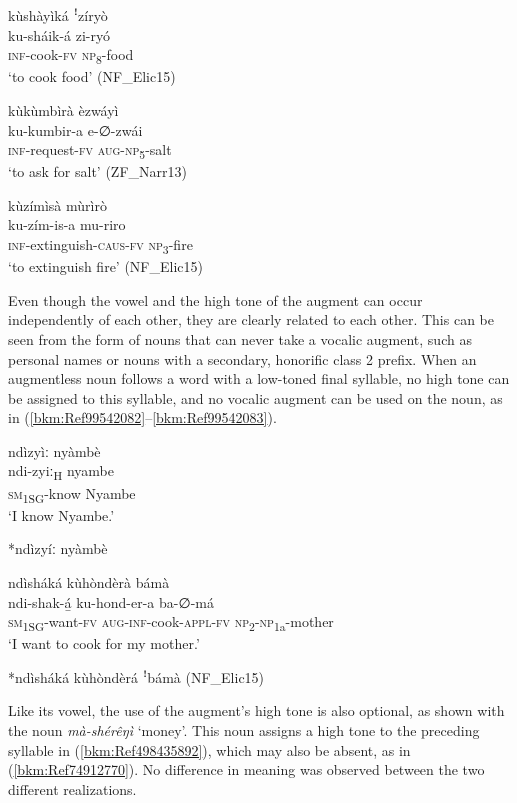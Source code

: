 \ea
\label{bkm:Ref441756770}
kùshàyìká ꜝzíryò\\
\gll ku-sháik-á  zi-ryó\\
\textsc{inf}-cook-\textsc{fv}  \textsc{np}\textsubscript{8}-food\\
\glt ‘to cook food’ (NF\_Elic15)
\z

\ea
\label{bkm:Ref441756760}
kùkùmbìrà èzwáyì\\
\gll ku-kumbir-a    e-∅-zwái\\
\textsc{inf}-request-\textsc{fv}  \textsc{aug}-\textsc{np}\textsubscript{5}-salt\\
\glt ‘to ask for salt’ (ZF\_Narr13)
\z

\ea
\label{bkm:Ref444249432}
kùzímìsà mùrìrò\\
\gll ku-zím-is-a      mu-riro\\
\textsc{inf}-extinguish-\textsc{caus}-\textsc{fv}  \textsc{np}\textsubscript{3}-fire\\
\glt ‘to extinguish fire’ (NF\_Elic15)
\z

Even though the vowel and the high tone of the augment can occur independently of each other, they are clearly related to each other. This can be seen from the form of nouns that can never take a vocalic augment, such as personal names or nouns with a secondary, honorific class 2 prefix. When an augmentless noun follows a word with a low-toned final syllable, no high tone can be assigned to this syllable, and no vocalic augment can be used on the noun, as in (\ref{bkm:Ref99542082}--\ref{bkm:Ref99542083}).

\ea
\label{bkm:Ref99542082}
\ea
ndìzyìː   nyàmbè\\
\gll ndi-zyiː\textsubscript{H}  nyambe\\
\textsc{sm}\textsubscript{1SG}-know  Nyambe\\
\glt ‘I know Nyambe.’

\ex
  *ndìzyíː nyàmbè 
\z
\z

\ea
\label{bkm:Ref99542083}
\ea
ndìsháká kùhòndèrà bámà\\
\gll ndi-shak-á̲    ku-hond-er-a    ba-∅-má\\
\textsc{sm}\textsubscript{1SG}-want-\textsc{fv}  \textsc{aug}-\textsc{inf}-cook-\textsc{appl}-\textsc{fv}  \textsc{np}\textsubscript{2}-\textsc{np}\textsubscript{1a}-mother\\
\glt ‘I want to cook for my mother.’

\ex
  *ndìsháká kùhòndèrá ꜝbámà (NF\_Elic15)
\z\z

Like its vowel, the use of the augment’s high tone is also optional, as shown with the noun \textit{mà-shérêŋì} ‘money’. This noun assigns a high tone to the preceding syllable in (\ref{bkm:Ref498435892}), which may also be absent, as in (\ref{bkm:Ref74912770}). No difference in meaning was observed between the two different realizations.

